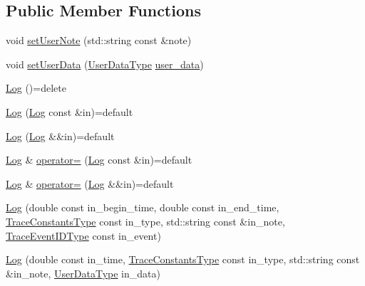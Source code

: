 \subsection*{Public Member Functions}
\begin{DoxyCompactItemize}
\item 
void \hyperlink{structvt_1_1trace_1_1_log_a823483c0dc5480368e03e89774a0ae9d}{set\+User\+Note} (std\+::string const \&note)
\item 
void \hyperlink{structvt_1_1trace_1_1_log_ae9ac348d526adb9f6c39d853cab5c3c3}{set\+User\+Data} (\hyperlink{structvt_1_1trace_1_1_log_af392c3825bf45d286a0f77bddf7a96cf}{User\+Data\+Type} \hyperlink{structvt_1_1trace_1_1_log_a7b251bc7dcebcbbafa29cc2ca6ea4c12}{user\+\_\+data})
\item 
\hyperlink{structvt_1_1trace_1_1_log_a60d449b9ab317e6b6bb93b4f0441fd2f}{Log} ()=delete
\item 
\hyperlink{structvt_1_1trace_1_1_log_a445abf4a0c8f48b1db961edf759566aa}{Log} (\hyperlink{structvt_1_1trace_1_1_log}{Log} const \&in)=default
\item 
\hyperlink{structvt_1_1trace_1_1_log_a7474e1eb2e7f2bfb879bb9e94773f82e}{Log} (\hyperlink{structvt_1_1trace_1_1_log}{Log} \&\&in)=default
\item 
\hyperlink{structvt_1_1trace_1_1_log}{Log} \& \hyperlink{structvt_1_1trace_1_1_log_aee97393891b92cb473bc4cee38542e52}{operator=} (\hyperlink{structvt_1_1trace_1_1_log}{Log} const \&in)=default
\item 
\hyperlink{structvt_1_1trace_1_1_log}{Log} \& \hyperlink{structvt_1_1trace_1_1_log_a49bd966fc97414a197f80a2cfbe55bb3}{operator=} (\hyperlink{structvt_1_1trace_1_1_log}{Log} \&\&in)=default
\item 
\hyperlink{structvt_1_1trace_1_1_log_ab16505d2b74f97dce47a6e8224bcd659}{Log} (double const in\+\_\+begin\+\_\+time, double const in\+\_\+end\+\_\+time, \hyperlink{namespacevt_1_1trace_acf454dfbd581b0ebae895f90b5927a1d}{Trace\+Constants\+Type} const in\+\_\+type, std\+::string const \&in\+\_\+note, \hyperlink{namespacevt_1_1trace_a64a7185f3e102df8d8258f263ccd1582}{Trace\+Event\+I\+D\+Type} const in\+\_\+event)
\item 
\hyperlink{structvt_1_1trace_1_1_log_a34566b4cd25feaed66e2f73db436fd97}{Log} (double const in\+\_\+time, \hyperlink{namespacevt_1_1trace_acf454dfbd581b0ebae895f90b5927a1d}{Trace\+Constants\+Type} const in\+\_\+type, std\+::string const \&in\+\_\+note, \hyperlink{structvt_1_1trace_1_1_log_af392c3825bf45d286a0f77bddf7a96cf}{User\+Data\+Type} in\+\_\+data)

\end{DoxyCompactItemize}
